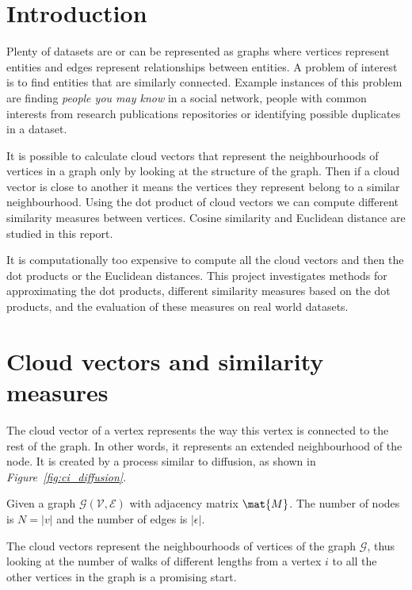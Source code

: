 \documentclass[12pt]{report}
\begin{document}
\section{Introduction}
%
Plenty of datasets are or can be represented as graphs where vertices represent
entities and edges represent relationships between entities. A problem of interest
is to find entities that are similarly connected. Example instances of this
problem are finding \textit{people you may know} in a social network, people with
common interests from research publications repositories or identifying possible
duplicates in a dataset.

It is possible to calculate cloud vectors that represent the neighbourhoods of
vertices in a graph only by looking at the structure of the graph. Then if a cloud
vector is close to another it means the vertices they represent belong to a similar
neighbourhood. Using the dot product of cloud vectors we can compute different
similarity measures between vertices. Cosine similarity and Euclidean distance
are studied in this report.

It is computationally too expensive to compute all the cloud vectors and then
the dot products or the Euclidean distances. This project investigates methods
for approximating the dot products, different similarity measures based on the
dot products, and the evaluation of these measures on real world datasets.


%
%
\section{Cloud vectors and similarity measures}

The cloud vector of a vertex represents the way this vertex is connected to the
rest of the graph. In other words, it represents an extended neighbourhood of the
node. It is created by a process similar to diffusion, as shown in
\emph{Figure~\ref{fig:ci_diffusion}}.

Given a graph $\mathcal{G}(\mathcal{V}, \mathcal{E})$ with adjacency matrix
$\mat{M}$. The number of nodes is $N = |v|$ and the number of edges is
$|\epsilon|$.

The cloud vectors represent the neighbourhoods of vertices of the graph
$\mathcal{G}$, thus looking at the number of walks of different lengths from a
vertex $i$ to all the other vertices in the graph is a promising start.
\end{document}
